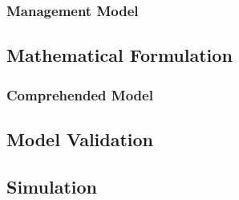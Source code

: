 \subsubsection{Management Model}


\subsection{Mathematical Formulation} %
\label{sub:mathematical_formulation}
\subsubsection{Comprehended Model}

\subsection{Model Validation} %
\label{sub:model_validation}


\subsection{Simulation} %
\label{sub:simulation}

